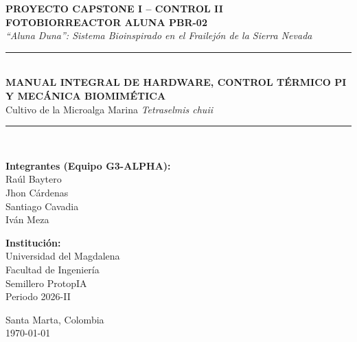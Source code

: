 \documentclass[11pt,letterpaper]{article}
\begin{document}
\begin{titlepage}
    \centering
    \vspace*{1cm}
    
    {\Huge \bfseries \color{alunadark} PROYECTO CAPSTONE I -- CONTROL II}\\[0.4cm]
    {\LARGE \bfseries \color{alunagreen} FOTOBIORREACTOR ALUNA PBR-02}\\[0.2cm]
    {\Large \textit{``Aluna Duna'': Sistema Bioinspirado en el Frailejón de la Sierra Nevada}}\\[1.5cm]
    
    \rule{\linewidth}{0.8mm}\\[0.5cm]
    {\huge \bfseries MANUAL INTEGRAL DE HARDWARE, CONTROL TÉRMICO PI Y MECÁNICA BIOMIMÉTICA}\\[0.3cm]
    {\large Cultivo de la Microalga Marina \textit{Tetraselmis chuii}}\\[0.5cm]
    \rule{\linewidth}{0.8mm}\\[2cm]
    
    \begin{minipage}{0.48\textwidth}
        \begin{flushleft} \large
            \textbf{Integrantes (Equipo G3-ALPHA):}\\
            Raúl Baytero\\
            Jhon Cárdenas\\
            Santiago Cavadia\\
            Iván Meza
        \end{flushleft}
    \end{minipage}
    \hfill
    \begin{minipage}{0.48\textwidth}
        \begin{flushright} \large
            \textbf{Institución:}\\
            Universidad del Magdalena\\
            Facultad de Ingeniería\\
            Semillero ProtopIA\\
            Periodo 2026-II
        \end{flushright}
    \end{minipage}
    
    \vfill
    {\large Santa Marta, Colombia \\ \today}
\end{titlepage}
\end{document}
